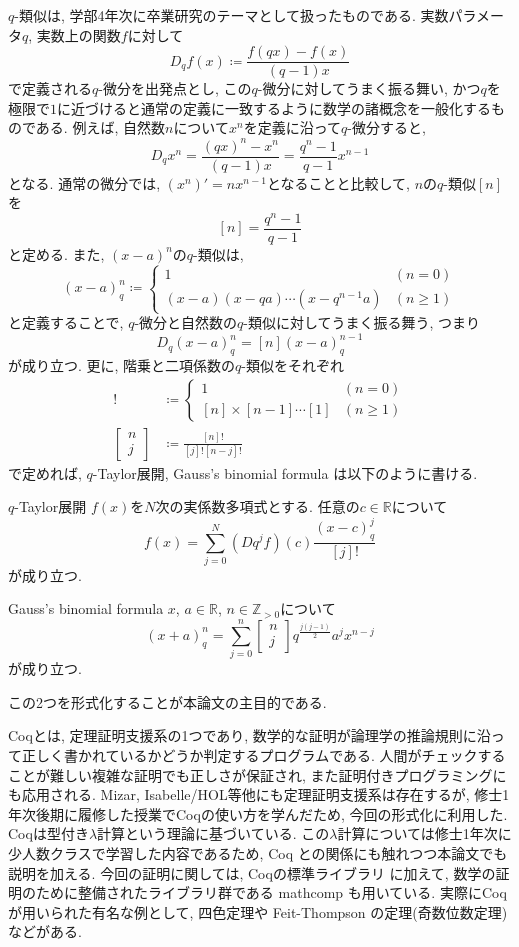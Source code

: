\documentclass[11pt]{jsreport}
\theoremstyle{mystyle}
\newcommand{\Z}{\mathbb{Z}}
\newcommand{\R}{\mathbb{R}}
\newcommand{\qcoe}[2]{\left[\begin{array}{ccc}#1\\#2\end{array}\right]}
\newcommand{\0}{\textbf{0}}
\newcommand{\1}{\textbf{1}}
\newcommand{\2}{\textbf{2}}
\begin{document}
$q$-類似は, 学部4年次に卒業研究のテーマとして扱ったものである. 実数パラメータ$q$, 実数上の関数$f$に対して
\[
  D_q f(x) \coloneqq \frac{f(qx) - f(x)}{(q - 1) x}
\]
で定義される$q$-微分を出発点とし, この$q$-微分に対してうまく振る舞い, かつ$q$を極限で$1$に近づけると通常の定義に一致するように数学の諸概念を一般化するものである.
例えば, 自然数$n$について$x^n$を定義に沿って$q$-微分すると, 
\[
  D_q x^n = \frac{(qx)^n - x^n}{(q - 1) x} = \frac{q^n - 1}{q - 1} x^{n - 1}
\]
となる. 通常の微分では, $(x^n)' = n x^{n - 1}$となることと比較して, $n$の$q$-類似$[n]$を
\[
  [n] = \frac{q^n - 1}{q - 1}
\]
と定める. また, $(x - a)^n$の$q$-類似は, 
\[
  (x - a)^n_q \coloneqq \begin{cases}
                                  1 & (n = 0) \\
                                  (x - a) (x - qa) \cdots (x - q^{n - 1} a) & (n \ge 1)
                                \end{cases}
\]
と定義することで, $q$-微分と自然数の$q$-類似に対してうまく振る舞う, つまり
\[
  D_q (x - a)^n_q = [n](x - a)^{n - 1}_q
\]
が成り立つ. 更に, 階乗と二項係数の$q$-類似をそれぞれ
\begin{align*}
  [n]! &\coloneqq \begin{cases}
                        1 & (n = 0)\\
                        [n] \times [n   - 1] \cdots [1] & (n \ge 1)
                      \end{cases}\\
  \qcoe{n}{j} &\coloneqq \frac{[n]!}{[j]![n - j]!}
\end{align*}
で定めれば, $q$-Taylor展開, Gauss's binomial formula は以下のように書ける. 
\begin{itembox}{$q$-Taylor展開}
  $f(x)$を$N$次の実係数多項式とする. 任意の$c \in \R$について
  \[
    f(x) = \sum_{j = 0}^N (Dq^j f) (c) \frac{(x - c)^j_q}{[j]!}
  \]
  が成り立つ. 
\end{itembox}
\begin{itembox}{Gauss's binomial formula}
  $x$, $a \in \R$, $n \in \Z_{>0}$について
  \[
    (x+a)^n_q = \sum_{j=0}^n \qcoe{n}{j} q^{\frac{j(j-1)}{2}} a^j x^{n-j}
  \]
  が成り立つ. 
\end{itembox}
この2つを形式化することが本論文の主目的である. 

Coqとは, 定理証明支援系の1つであり, 数学的な証明が論理学の推論規則に沿って正しく書かれているかどうか判定するプログラムである.
人間がチェックすることが難しい複雑な証明でも正しさが保証され, また証明付きプログラミングにも応用される. Mizar, Isabelle/HOL等他にも定理証明支援系は存在するが, 修士1年次後期に履修した授業でCoqの使い方を学んだため, 今回の形式化に利用した. 
Coqは型付き$\lambda$計算という理論に基づいている. この$\lambda$計算については修士1年次に少人数クラスで学習した内容であるため, Coq との関係にも触れつつ本論文でも説明を加える. 今回の証明に関しては, Coqの標準ライブラリ \cite{coq sl}に加えて, 数学の証明のために整備されたライブラリ群である mathcomp \cite{coq mc}も用いている. 
実際にCoqが用いられた有名な例として, 四色定理や Feit-Thompson の定理(奇数位数定理)などがある. 
\end{document}
